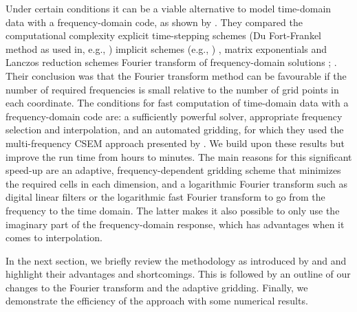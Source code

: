 \documentclass[extra, camera,%
    onecolumn,   %
    referee,     %
]{gji}
\begin{document}
Under certain conditions it can be a viable alternative to model time-domain
data with a frequency-domain code, as shown by \cite{GEO.08.Mulder}. They
compared the computational complexity   explicit time-stepping schemes (Du
Fort-Frankel method as used in, e.g., \cite{GEO.04.Commer,
GEO.07.Maao}) implicit schemes (e.g.,
\cite{GEO.04.Haber}) ,  matrix exponentials and Lanczos reduction schemes
\cite[e.g., ][]{RS.94.Druskin}  Fourier transform of frequency-domain solutions
; . Their conclusion was
that the Fourier transform method can be favourable if the number of required
frequencies is small relative to the number of grid points in each coordinate.
The conditions for fast computation of time-domain data with a frequency-domain
code are: a sufficiently powerful solver, appropriate frequency selection and
interpolation, and an automated gridding, for which they used the
multi-frequency CSEM approach presented by \cite{GEO.07.Plessix}. We build upon
these results but improve the run time from hours to minutes. The main reasons
for this significant speed-up are  an adaptive, frequency-dependent gridding scheme that minimizes
the required cells in each dimension, and a logarithmic Fourier transform such
as digital linear filters \citep[DLF, ][]{GP.71.Ghosh} or the logarithmic fast
Fourier transform \citep[FFTLog, ][]{RAS.00.Hamilton} to go from the frequency
to the time domain. The latter makes it also possible to only use the imaginary
part of the frequency-domain response, which has advantages when it comes to
interpolation.

 In the
next section, we briefly review the methodology as introduced by
\cite{GEO.07.Plessix} and \cite{GEO.08.Mulder} and highlight their advantages
and shortcomings. This is followed by an outline of 
our changes to the Fourier transform and the adaptive gridding. Finally, we
demonstrate the efficiency of the approach with some numerical results.
\end{document}
